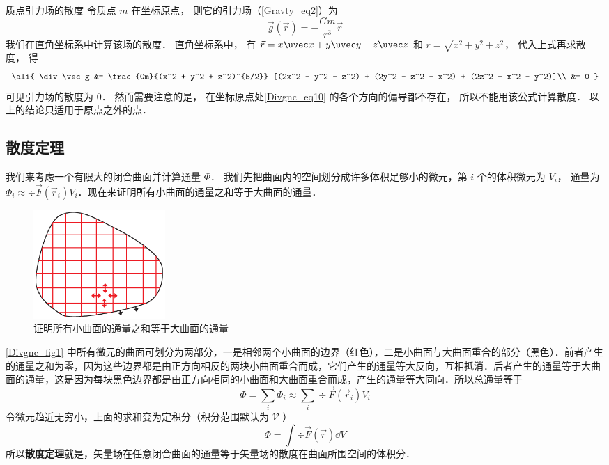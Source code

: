 \begin{exam}{质点引力场的散度}
令质点 $m$ 在坐标原点， 则它的引力场（\autoref{Gravty_eq2}）为
\begin{equation}\label{Divgnc_eq10}
\vec g(\vec r) = -\frac{Gm}{r^3}\vec r
\end{equation}
我们在直角坐标系中计算该场的散度． 直角坐标系中， 有 $\vec r = x\uvec x + y\uvec y + z\uvec z$ 和 $r = \sqrt{x^2 + y^2 + z^2}$， 代入上式再求散度， 得
\begin{equation}\ali{
\div \vec g &= \frac{Gm}{(x^2 + y^2 + z^2)^{5/2}} [(2x^2 - y^2 - z^2) + (2y^2 - z^2 - x^2) + (2z^2 - x^2 - y^2)]\\
&= 0
}\end{equation}
可见引力场的散度为 0． 然而需要注意的是， 在坐标原点处\autoref{Divgnc_eq10} 的各个方向的偏导都不存在， 所以不能用该公式计算散度． 以上的结论只适用于原点之外的点．
\end{exam}


\subsection{散度定理}

我们来考虑一个有限大的闭合曲面并计算通量 $\Phi$． 我们先把曲面内的空间划分成许多体积足够小的微元，第 $i$ 个的体积微元为 $V_i$， 通量为 $\Phi _i \approx \div \vec F(\vec r_i) V_i$．现在来证明所有小曲面的通量之和等于大曲面的通量．
\begin{figure}[ht]
\centering
\includegraphics[width=5cm]{./figures/Divgnc.pdf}
\caption{证明所有小曲面的通量之和等于大曲面的通量} \label{Divgnc_fig1}
\end{figure}
\autoref{Divgnc_fig1} 中所有微元的曲面可划分为两部分，一是相邻两个小曲面的边界（红色），二是小曲面与大曲面重合的部分（黑色）．前者产生的通量之和为零，因为这些边界都是由正方向相反的两块小曲面重合而成，它们产生的通量等大反向，互相抵消．后者产生的通量等于大曲面的通量，这是因为每块黑色边界都是由正方向相同的小曲面和大曲面重合而成，产生的通量等大同向．所以总通量等于
\begin{equation}
\Phi  = \sum_i \Phi _i  \approx \sum_i \div \vec F (\vec r_i) V_i
\end{equation}
令微元趋近无穷小，上面的求和变为定积分（积分范围默认为 $\mathcal V$ ）
\begin{equation}
\Phi  = \int \div \vec F(\vec r) \dd{V}
\end{equation}
所以\textbf{散度定理}就是，矢量场在任意闭合曲面的通量等于矢量场的散度在曲面所围空间的体积分．



